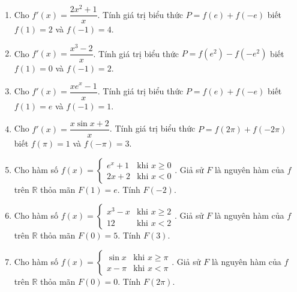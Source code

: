 \documentclass[12pt]{article}
\begin{document}
	\begin{btvang}
		\begin{enumerate}[label=\alph*), resume]
			\item Cho $f'(x) = \dfrac{2x^2 + 1}{x}$. Tính giá trị biểu thức $P = f(e) + f(-e)$ biết $f(1) = 2$ và $f(-1) = 4$.
			\item Cho $f'(x) = \dfrac{x^3 - 2}{x}$. Tính giá trị biểu thức $P = f(e^2) - f(-e^2)$ biết $f(1) = 0$ và $f(-1) = 2$.
			\item Cho $f'(x) = \dfrac{x e^x - 1}{x}$. Tính giá trị biểu thức $P = f(e) + f(-e)$ biết $f(1) = e$ và $f(-1) = 1$.
			\item Cho $f'(x) = \dfrac{x \sin x + 2}{x}$. Tính giá trị biểu thức $P = f(2\pi) + f(-2\pi)$ biết $f(\pi) = 1$ và $f(-\pi) = 3$.
			\item Cho hàm số $f(x) = \begin{cases} e^x + 1 & \text{khi } x \ge 0 \\ 2x + 2 & \text{khi } x < 0 \end{cases}$. Giả sử $F$ là nguyên hàm của $f$ trên $\mathbb{R}$ thỏa mãn $F(1) = e$. Tính $F(-2)$.
			\item Cho hàm số $f(x) = \begin{cases} x^3 - x & \text{khi } x \ge 2 \\ 12 & \text{khi } x < 2 \end{cases}$. Giả sử $F$ là nguyên hàm của $f$ trên $\mathbb{R}$ thỏa mãn $F(0) = 5$. Tính $F(3)$.
			\item Cho hàm số $f(x) = \begin{cases} \sin x & \text{khi } x \ge \pi \\ x - \pi & \text{khi } x < \pi \end{cases}$. Giả sử $F$ là nguyên hàm của $f$ trên $\mathbb{R}$ thỏa mãn $F(0) = 0$. Tính $F(2\pi)$.
		\end{enumerate}
	\end{btvang}
	
\end{document}
